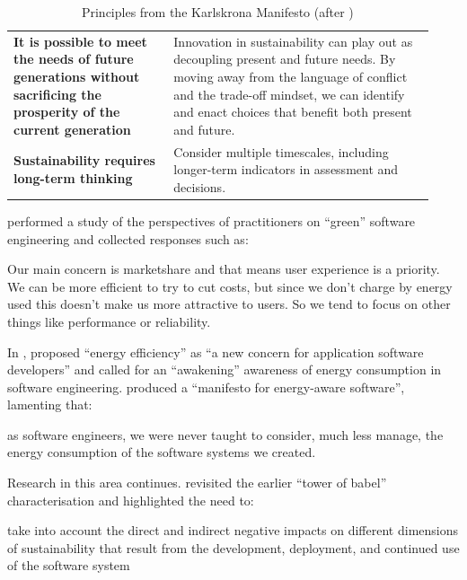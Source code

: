 \begin{table}[htbp]
\begin{tabular}{>{\raggedright}p{0.35\linewidth} | p{0.58\linewidth}}
        \textbf{It is possible to meet the needs of future generations without sacrificing the prosperity of the current generation} & Innovation in sustainability can play out as decoupling present and future needs. By moving away from the language of conflict and the trade-off mindset, we can identify and enact choices that benefit both present and future. \\
        \textbf{Sustainability requires long-term thinking} & Consider multiple timescales, including longer-term indicators in assessment and decisions. \\
        \hline
    \end{tabular}
    \caption{Principles from the Karlskrona Manifesto (after \citet{Becker2015})}
    \label{karlskrona}
\end{table}

\citet{Manotas2016} performed a study of the perspectives of practitioners on \enquote{green} software engineering and collected responses such as:

\begin{displayquote}
Our main concern is marketshare and that means user experience is a priority. We can be more efficient to try to cut costs, but since we don’t charge by energy used this doesn’t make us more attractive to users. So we tend to focus on other things like performance or reliability. \citep[p.241]{Manotas2016}
\end{displayquote}

In \citeyear{Pinto2017a}, \citeauthor{Pinto2017a} proposed \enquote{energy efficiency} as \enquote{a new concern for application software developers} and \citet{Jagroep2017} called for an \enquote{awakening} awareness of energy consumption in software engineering. \citet{Fonseca2019} produced a \enquote{manifesto for energy-aware software}, lamenting that:

\begin{displayquote}
as software engineers, we were never taught to consider, much less manage, the energy consumption of the software systems we created. \citep[p.79]{Fonseca2019}
\end{displayquote}

Research in this area continues. \citet{Venters2021} revisited the earlier \enquote{tower of babel} characterisation and highlighted the need to:
\begin{displayquote}
take into account the direct and indirect negative impacts on different dimensions of sustainability that result from the development, deployment, and continued use of the software system \citep[p. 2]{Venters2021}
\end{displayquote}

